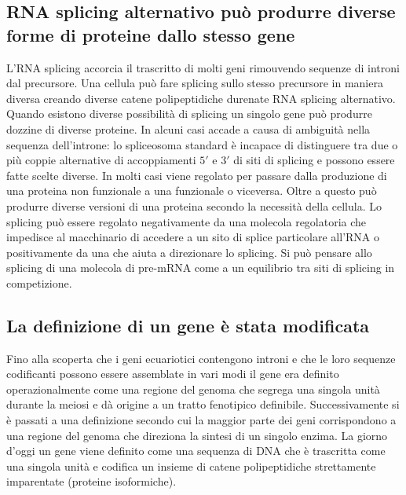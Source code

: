 \subsection{RNA splicing alternativo pu\`o produrre diverse forme di proteine dallo stesso gene}
L'RNA splicing accorcia il trascritto di molti geni rimouvendo sequenze di introni dal precursore. Una cellula pu\`o fare splicing sullo stesso precursore in maniera diversa creando 
diverse catene polipeptidiche durenate RNA splicing alternativo. Quando esistono diverse possibilit\`a di splicing un singolo gene pu\`o produrre dozzine di diverse proteine. In alcuni
casi accade a causa di ambiguit\`a nella sequenza dell'introne: lo spliceosoma standard \`e incapace di distinguere tra due o pi\`u coppie alternative di accoppiamenti $5'$ e $3'$ di 
siti di splicing e possono essere fatte scelte diverse. In molti casi viene regolato per passare dalla produzione di una proteina non funzionale  a una funzionale o viceversa. Oltre a
questo pu\`o produrre diverse versioni di una proteina secondo la necessit\`a della cellula. Lo splicing pu\`o essere regolato negativamente da una molecola regolatoria che impedisce 
al macchinario di accedere a un sito di splice particolare all'RNA o positivamente da una che aiuta a direzionare lo splicing. Si pu\`o pensare allo splicing di una molecola di pre-mRNA
come a un equilibrio tra siti di splicing in competizione. 
\subsection{La definizione di un gene \`e stata modificata}
Fino alla scoperta che i geni ecuariotici contengono introni e che le loro sequenze codificanti possono essere assemblate in vari modi il gene era definito operazionalmente come una
regione del genoma che segrega una singola unit\`a durante la meiosi e d\`a origine a un tratto fenotipico definibile. Successivamente si \`e passati a una definizione secondo cui
la maggior parte dei geni corrispondono a una regione del genoma che direziona la sintesi di un singolo enzima. La giorno d'oggi un gene viene definito come una sequenza di DNA che \`e
trascritta come una singola unit\`a e codifica un insieme di catene polipeptidiche strettamente imparentate (proteine isoformiche). 
